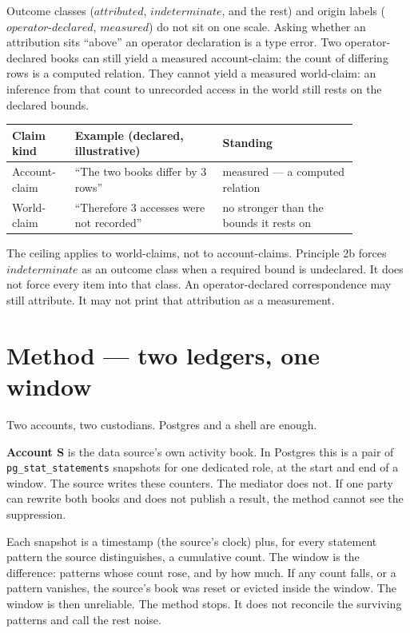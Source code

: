\documentclass[11pt]{article}
\begin{document}
Outcome classes ($\mathit{attributed}$, $\mathit{indeterminate}$, and the rest) and origin labels ($\mathit{operator\text{-}declared}$, $\mathit{measured}$) do not sit on one scale. Asking whether an attribution sits ``above'' an operator declaration is a type error. Two operator-declared books can still yield a measured account-claim: the count of differing rows is a computed relation. They cannot yield a measured world-claim: an inference from that count to unrecorded access in the world still rests on the declared bounds.

\begin{tabular}{@{}p{0.15\linewidth}p{0.37\linewidth}p{0.34\linewidth}@{}}
\toprule
Claim kind & Example (declared, illustrative) & Standing \\
\midrule
Account-claim & ``The two books differ by 3 rows'' & measured --- a computed relation \\
World-claim & ``Therefore 3 accesses were not recorded'' & no stronger than the bounds it rests on \\
\bottomrule
\end{tabular}

\vspace{1em}

The ceiling applies to world-claims, not to account-claims. Principle 2b forces $\mathit{indeterminate}$ as an outcome class when a required bound is undeclared. It does not force every item into that class. An operator-declared correspondence may still attribute. It may not print that attribution as a measurement.

\section{Method --- two ledgers, one window}

Two accounts, two custodians. Postgres and a shell are enough.

\textbf{Account S} is the data source's own activity book. In Postgres this is a pair of \texttt{pg\_stat\_statements} snapshots for one dedicated role, at the start and end of a window. The source writes these counters. The mediator does not. If one party can rewrite both books and does not publish a result, the method cannot see the suppression.

Each snapshot is a timestamp (the source's clock) plus, for every statement pattern the source distinguishes, a cumulative count. The window is the difference: patterns whose count rose, and by how much. If any count falls, or a pattern vanishes, the source's book was reset or evicted inside the window. The window is then unreliable. The method stops. It does not reconcile the surviving patterns and call the rest noise.
\end{document}
